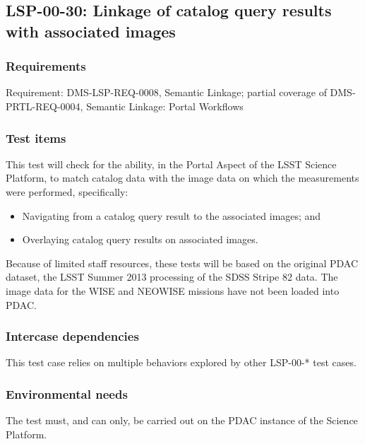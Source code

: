 \subsection{LSP-00-30: Linkage of catalog query results with associated images}
\label{lsp-00-30}

\subsubsection{Requirements}

Requirement: DMS-LSP-REQ-0008, Semantic Linkage; partial coverage of DMS-PRTL-REQ-0004, Semantic Linkage: Portal Workflows

\subsubsection{Test items}

This test will check for the ability, in the Portal Aspect of the LSST Science Platform, to match catalog data with the image data on which the measurements were performed, specifically:

\begin{itemize}

  \item{Navigating from a catalog query result to the associated images; and}
  \item{Overlaying catalog query results on associated images.}

\end{itemize}

Because of limited staff resources, these tests will be based on the original PDAC dataset, the LSST Summer 2013 processing of the SDSS Stripe 82 data.
The image data for the WISE and NEOWISE missions have not been loaded into PDAC.

\subsubsection{Intercase dependencies}

This test case relies on multiple behaviors explored by other LSP-00-* test cases.

\subsubsection{Environmental needs}

The test must, and can only, be carried out on the PDAC instance of the Science Platform.

